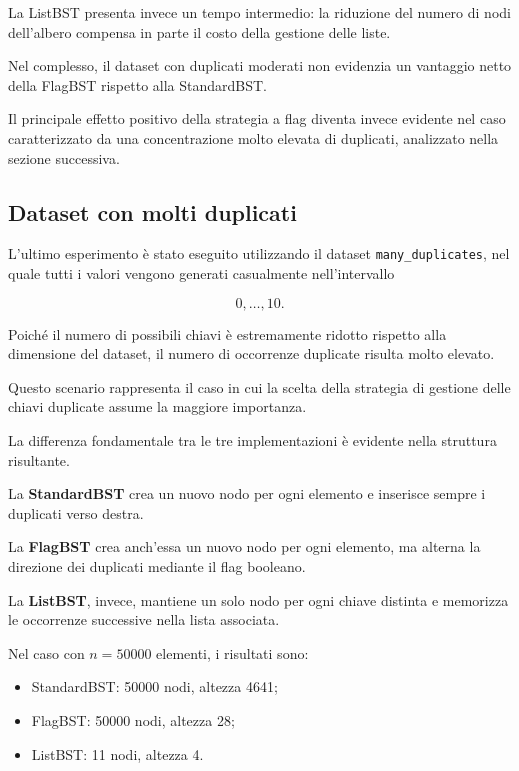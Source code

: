 \documentclass[a4paper,12pt]{article}
\begin{document}
La ListBST presenta invece un tempo intermedio: la riduzione del numero di nodi dell'albero compensa in parte il costo della gestione delle liste.

Nel complesso, il dataset con duplicati moderati non evidenzia un vantaggio netto della FlagBST rispetto alla StandardBST.

Il principale effetto positivo della strategia a flag diventa invece evidente nel caso caratterizzato da una concentrazione molto elevata di duplicati, analizzato nella sezione successiva.

\clearpage

\subsection{Dataset con molti duplicati}

L'ultimo esperimento è stato eseguito utilizzando il dataset \texttt{many\_duplicates}, nel quale tutti i valori vengono generati casualmente nell'intervallo

\[
0,\ldots,10.
\]

Poiché il numero di possibili chiavi è estremamente ridotto rispetto alla dimensione del dataset, il numero di occorrenze duplicate risulta molto elevato.

Questo scenario rappresenta il caso in cui la scelta della strategia di gestione delle chiavi duplicate assume la maggiore importanza.

La differenza fondamentale tra le tre implementazioni è evidente nella struttura risultante.

La \textbf{StandardBST} crea un nuovo nodo per ogni elemento e inserisce sempre i duplicati verso destra.

La \textbf{FlagBST} crea anch'essa un nuovo nodo per ogni elemento, ma alterna la direzione dei duplicati mediante il flag booleano.

La \textbf{ListBST}, invece, mantiene un solo nodo per ogni chiave distinta e memorizza le occorrenze successive nella lista associata.

Nel caso con $n=50000$ elementi, i risultati sono:

\begin{itemize}

    \item StandardBST: 50000 nodi, altezza 4641;

    \item FlagBST: 50000 nodi, altezza 28;

    \item ListBST: 11 nodi, altezza 4.

\end{itemize}
\end{document}
